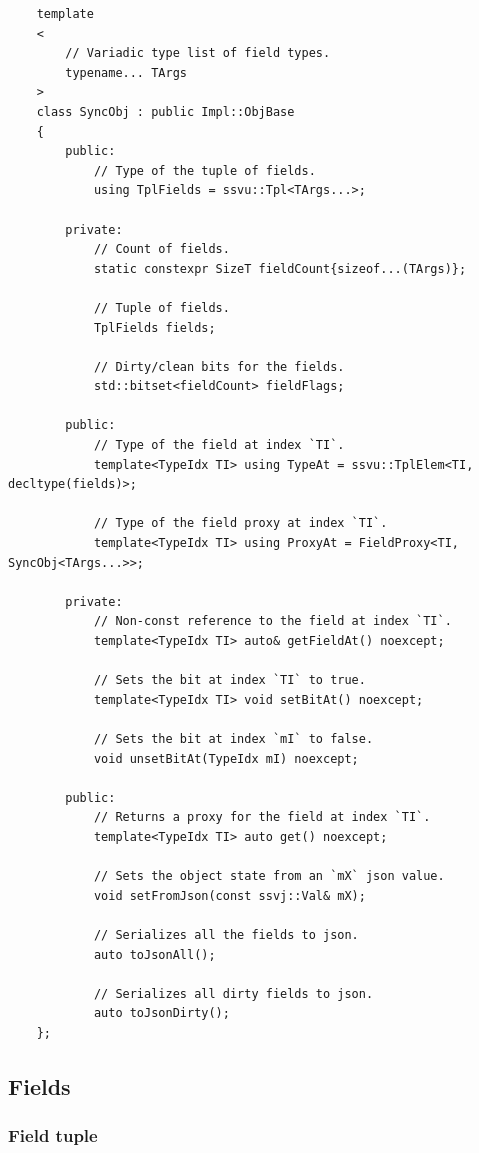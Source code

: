 \documentclass{report}
\begin{document}
\begin{verbatim}
    template
    <
        // Variadic type list of field types.
        typename... TArgs
    > 
    class SyncObj : public Impl::ObjBase
    {
        public:
            // Type of the tuple of fields.
            using TplFields = ssvu::Tpl<TArgs...>;

        private:
            // Count of fields.
            static constexpr SizeT fieldCount{sizeof...(TArgs)};

            // Tuple of fields.
            TplFields fields;

            // Dirty/clean bits for the fields.
            std::bitset<fieldCount> fieldFlags;

        public:
            // Type of the field at index `TI`.
            template<TypeIdx TI> using TypeAt = ssvu::TplElem<TI, decltype(fields)>;

            // Type of the field proxy at index `TI`.
            template<TypeIdx TI> using ProxyAt = FieldProxy<TI, SyncObj<TArgs...>>;

        private:
            // Non-const reference to the field at index `TI`.
            template<TypeIdx TI> auto& getFieldAt() noexcept;

            // Sets the bit at index `TI` to true.
            template<TypeIdx TI> void setBitAt() noexcept;

            // Sets the bit at index `mI` to false.
            void unsetBitAt(TypeIdx mI) noexcept;

        public:
            // Returns a proxy for the field at index `TI`.
            template<TypeIdx TI> auto get() noexcept;

            // Sets the object state from an `mX` json value.
            void setFromJson(const ssvj::Val& mX);

            // Serializes all the fields to json.
            auto toJsonAll();

            // Serializes all dirty fields to json.
            auto toJsonDirty();
    };
\end{verbatim}

            \subsection{Fields}                

                \subsubsection{Field tuple}
\end{document}
